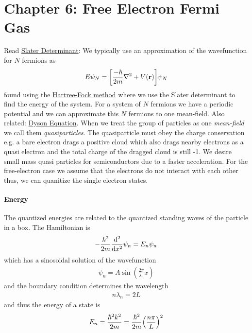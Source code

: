 \documentclass[../main.tex]{subfiles}
\begin{document}
\pagestyle{fancy}

\section*{Chapter 6: Free Electron Fermi Gas}

Read
\href{https://en.wikipedia.org/wiki/Slater_determinant}{Slater Determinant}:
We typically use an approximation of the wavefunction for $N$ fermions as
\begin{align*}
    E\psi_N = \qt[\frac{-\hbar}{2m} \laplacian + V(\vb{r})] \psi_N
\end{align*}
found using the \href{https://en.wikipedia.org/wiki/Hartree%E2%80%93Fock_method}{Hartree-Fock method}
where we use the Slater determinant to find the energy of the system. For a system of $N$ fermions
we have a periodic potential and we can approximate this $N$ fermions to one mean-field. Also 
related: \href{https://en.wikipedia.org/wiki/Schwinger%E2%80%93Dyson_equation}{Dyson Equation}. When
we treat the group of particles as one \emph{mean-field} we call them \emph{quasiparticles}. The 
quasiparticle must obey the charge conservation e.g. a bare electron drags a positive cloud which
also drags nearby electrons as a quasi electron and the total charge of the dragged cloud is still
-1. We desire small mass quasi particles for semiconductors due to a faster acceleration. For the
free-electron case we assume that the electrons do not interact with each other thus, we can 
quanitize the single electron states.

\paragraph*{Energy} The quantized energies are related to the quantized standing waves of the 
particle in a box. The Hamiltonian is
\begin{align*}
    -\frac{\hbar^2}{2m} \dv[2]{x} \psi_n = E_n \psi_n
\end{align*}
which has a sinosoidal solution of the wavefunction
\begin{align*}
    \psi_n = A \sin(\frac{2\pi}{\lambda_n} x) 
\end{align*}
and the boundary condition determines the wavelength
\begin{align*}
    n \lambda_n = 2L
\end{align*}
and thus the energy of a state is
\begin{align*}
    E_n = \frac{\hbar^2 k^2}{2m} = \frac{\hbar^2}{2m} \qt(\frac{n\pi}{L})^2
\end{align*}
\end{document}
